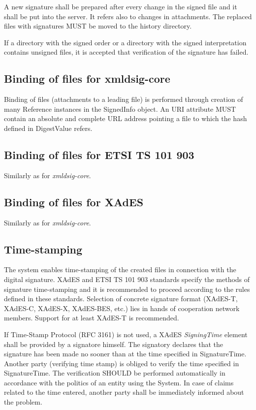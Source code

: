 \documentclass[a4paper]{article}
\begin{document}
A new signature shall be prepared after every change in the signed file and it shall be put 
into the server. It refers also to changes in attachments. The replaced files with signatures 
MUST be moved to the history directory.

If a directory with the signed order or a directory with the signed interpretation contains 
unsigned files, it is accepted that verification of the signature has failed.

\subsection{Binding of files for xmldsig-core}

Binding of files (attachments to a leading file) is performed through creation of many 
Reference instances in the SignedInfo object. An URI attribute MUST contain an absolute and 
complete URL address pointing a file to which the hash defined in DigestValue refers.

\subsection{Binding of files for ETSI TS 101 903}

Similarly as for \emph{xmldsig-core}.

\subsection{Binding of files for XAdES}

Similarly as for \emph{xmldsig-core}.

\subsection{Time-stamping}

The system enables time-stamping of the created files in connection with the digital signature.
XAdES and ETSI TS 101 903 standards specify the methods of signature time-stamping and it 
is recommended to proceed according to the rules defined in these standards. Selection of
concrete signature format (XAdES-T, XAdES-C, XAdES-X, XAdES-BES, etc.) lies in hands of 
cooperation network members. Support for at least XAdES-T is recommended. 

If Time-Stamp Protocol (RFC 3161) is not used, a XAdES \emph{SigningTime} element 
shall be provided by a signatore himself. The signatory 
declares that the signature has been made no sooner than at the time specified in SignatureTime. 
Another party (verifying time stamp) is obliged to verify the time specified in SignatureTime. 
The verification SHOULD be performed automatically in accordance with the politics of an 
entity using the System. In case of claims related to the time entered, another party shall 
be immediately informed about the problem.
\end{document}
